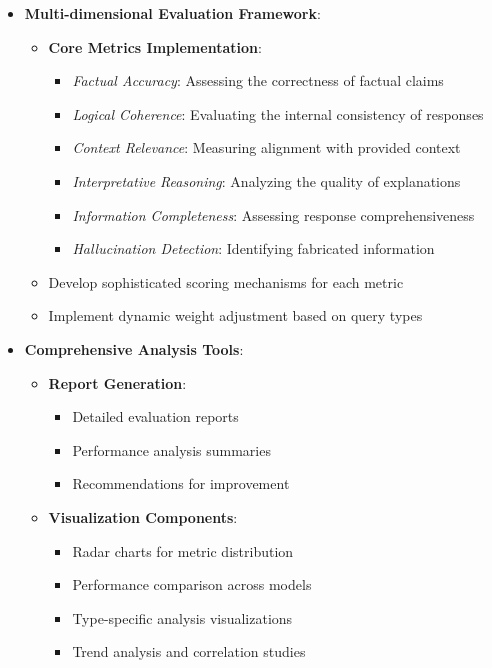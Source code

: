 \begin{itemize}
    \item \textbf{Multi-dimensional Evaluation Framework}:
    \begin{itemize}
        \item \textbf{Core Metrics Implementation}:
        \begin{itemize}
            \item \textit{Factual Accuracy}: Assessing the correctness of factual claims
            \item \textit{Logical Coherence}: Evaluating the internal consistency of responses
            \item \textit{Context Relevance}: Measuring alignment with provided context
            \item \textit{Interpretative Reasoning}: Analyzing the quality of explanations
            \item \textit{Information Completeness}: Assessing response comprehensiveness
            \item \textit{Hallucination Detection}: Identifying fabricated information
        \end{itemize}
        \item Develop sophisticated scoring mechanisms for each metric
        \item Implement dynamic weight adjustment based on query types
    \end{itemize}

    \item \textbf{Comprehensive Analysis Tools}:
    \begin{itemize}
        \item \textbf{Report Generation}:
        \begin{itemize}
            \item Detailed evaluation reports
            \item Performance analysis summaries
            \item Recommendations for improvement
        \end{itemize}
        \item \textbf{Visualization Components}:
        \begin{itemize}
            \item Radar charts for metric distribution
            \item Performance comparison across models
            \item Type-specific analysis visualizations
            \item Trend analysis and correlation studies
        \end{itemize}
    \end{itemize}


\end{itemize}
